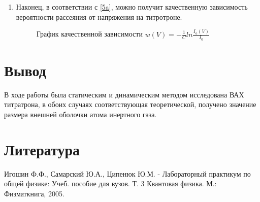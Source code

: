 \documentclass[a4paper]{article}
\begin{document}
\begin{enumerate}
    \item Наконец, в соответствии с \eqref{5a}, можно получит качественную зависимость вероятности рассеяния от напряжения на титротроне. 
    \begin{figure}[H]
    \centering
    \caption{График качественной зависимости $w(V) = -\frac{1}{C}ln\frac{I_a(V)}{I_0}$}
    \end{figure}
\end{enumerate}



\section{Вывод}
В ходе работы была статическим и динамическим методом исследована ВАХ титратрона, в обоих случаях соответствующая теоретической, получено значение размера внешней оболочки атома инертного газа.

\section{Литература}
Игошин Ф.Ф., Самарский Ю.А., Ципенюк Ю.М. - Лабораторный практикум по общей физике: Учеб. пособие для вузов. Т. 3 Квантовая физика. 
М.: Физматкнига, 2005.
\end{document}
